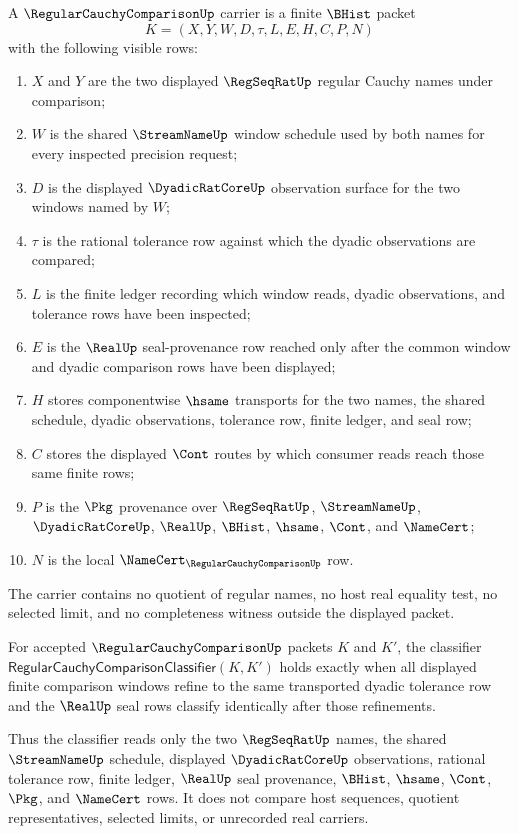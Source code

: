 \begin{definition}
\label{def:regular-cauchy-comparison-carrier}
A $\RegularCauchyComparisonUp$ carrier is a finite $\BHist$ packet
$$
K=(X,Y,W,D,\tau,L,E,H,C,P,N)
$$
with the following visible rows:
\begin{enumerate}
\item $X$ and $Y$ are the two displayed $\RegSeqRatUp$ regular Cauchy names under comparison;
\item $W$ is the shared $\StreamNameUp$ window schedule used by both names for every inspected precision request;
\item $D$ is the displayed $\DyadicRatCoreUp$ observation surface for the two windows named by $W$;
\item $\tau$ is the rational tolerance row against which the dyadic observations are compared;
\item $L$ is the finite ledger recording which window reads, dyadic observations, and tolerance rows have been inspected;
\item $E$ is the $\RealUp$ seal-provenance row reached only after the common window and dyadic comparison rows have been displayed;
\item $H$ stores componentwise $\hsame$ transports for the two names, the shared schedule, dyadic observations, tolerance row, finite ledger, and seal row;
\item $C$ stores the displayed $\Cont$ routes by which consumer reads reach those same finite rows;
\item $P$ is the $\Pkg$ provenance over $\RegSeqRatUp$, $\StreamNameUp$, $\DyadicRatCoreUp$, $\RealUp$, $\BHist$, $\hsame$, $\Cont$, and $\NameCert$;
\item $N$ is the local $\NameCert_{\RegularCauchyComparisonUp}$ row.
\end{enumerate}
The carrier contains no quotient of regular names, no host real equality test, no selected limit, and no completeness witness outside the displayed packet.
\end{definition}

\begin{definition}
\label{def:regular-cauchy-comparison-classifier}
For accepted $\RegularCauchyComparisonUp$ packets $K$ and $K'$, the classifier $\mathsf{RegularCauchyComparisonClassifier}(K,K')$ holds exactly when all displayed finite comparison windows refine to the same transported dyadic tolerance row and the $\RealUp$ seal rows classify identically after those refinements.

Thus the classifier reads only the two $\RegSeqRatUp$ names, the shared $\StreamNameUp$ schedule, displayed $\DyadicRatCoreUp$ observations, rational tolerance row, finite ledger, $\RealUp$ seal provenance, $\BHist$, $\hsame$, $\Cont$, $\Pkg$, and $\NameCert$ rows. It does not compare host sequences, quotient representatives, selected limits, or unrecorded real carriers.
\end{definition}


